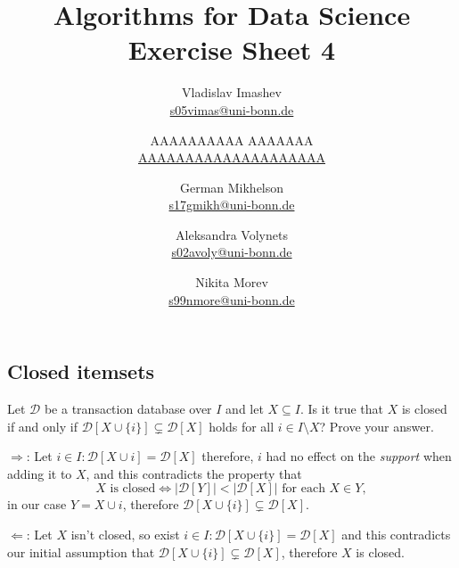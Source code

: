 \documentclass{article}
\title{Algorithms for Data Science \\ Exercise Sheet 4}
\author{
  Vladislav Imashev \\ \href{mailto:s05vimas@uni-bonn.de}{s05vimas@uni-bonn.de} \and
  AAAAAAAAAA AAAAAAA \\ \href{mailto:AAAAAAAAAAAAAAAAAAAA}{AAAAAAAAAAAAAAAAAAAA} \and
  German Mikhelson \\ \href{mailto:s17gmikh@uni-bonn.de}{s17gmikh@uni-bonn.de} \and
  Aleksandra Volynets \\ \href{mailto:s02avoly@uni-bonn.de}{s02avoly@uni-bonn.de} \and
  Nikita Morev \\ \href{mailto:s99nmore@uni-bonn.de}{s99nmore@uni-bonn.de}
}
\begin{document}
  \maketitle

  \setcounter{section}{4}
  \subsection{Closed itemsets}
  \begin{centerframebox}
    Let $\mathcal{D}$ be a transaction database over $I$ and let $X \subseteq I$. Is
    it true that $X$ is closed if and only if $\mathcal{D}[X \cup \{i\}] \subsetneq \mathcal{D}[X]$ holds for all
    $i \in I \setminus X$? Prove your answer.
  \end{centerframebox}

  $\Rightarrow$: Let $i \in I: \mathcal{D}[X \cup {i}] = \mathcal{D}[X]$ therefore, $i$ had no effect on the \textit{support} when adding it to $X$, and this contradicts the property that
  \[X\text{ is closed} \iff |\mathcal{D}[Y]| < |\mathcal{D}[X]| \text{ for each } X \in Y, \]
  in our case $Y = X \cup {i}$, therefore $\mathcal{D}[X \cup \{i\}] \subsetneq \mathcal{D}[X]$.

  $\Leftarrow$: Let $X$ isn't closed, so exist $i \in I: \mathcal{D}[X \cup \{i\}] = \mathcal{D}[X]$ and this contradicts our initial assumption that $\mathcal{D}[X \cup \{i\}] \subsetneq \mathcal{D}[X]$, therefore $X$ is closed.
\end{document}
